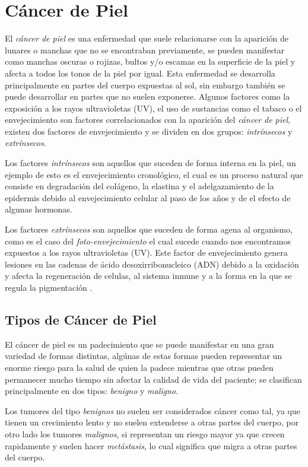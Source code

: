 \section{Cáncer de Piel}
El \emph{cáncer de piel} es una enfermedad que suele relacionarse con la aparición de lunares o manchas que no se encontraban previamente, se pueden manifestar como manchas oscuras o rojizas, bultos y/o escamas en la superficie de la piel y afecta a todos los tonos de la piel por igual. Esta enfermedad se desarrolla principalmente en partes del cuerpo expuestas al sol, sin embargo también se puede desarrollar en partes que no suelen exponerse. Algunos factores como la exposición a los rayos ultravioletas (UV), el uso de sustancias como el tabaco o el envejecimiento son factores correlacionados con la aparición del \emph{cáncer de piel}, existen dos factores de envejecimiento y se dividen en dos grupos: \emph{intrínsecos} y \emph{extrínsecos}.

Los factores \emph{intrínsecos} son aquellos que suceden de forma interna en la piel, un ejemplo de esto es el envejecimiento cronológico, el cual es un proceso natural que consiste en degradación del colágeno, la elastina y el adelgazamiento de la epidermis debido al envejecimiento celular al paso de los años y de el efecto de algunas hormonas.

Los factores \emph{extrínsecos} son aquellos que suceden de forma agena al organismo, como es el caso del \emph{foto-envejecimiento} el cual sucede cuando nos encontramos expuestos a los rayos ultravioletas (UV). Este factor de envejecimiento genera lesiones en las cadenas de ácido desoxirribonucleico (ADN) debido a la oxidación y afecta la regeneración de celulas, al sistema inmune y a la forma en la que se regula la pigmentación \citep{skin_aging}.

\subsection{Tipos de Cáncer de Piel}
El cáncer de piel es un padecimiento que se puede manifestar en una gran variedad de formas distintas, algúnas de estas formas pueden representar un enorme riesgo para la salud de quien la padece mientras que otras pueden permanecer mucho tiempo sin afectar la calidad de vida del paciente; se clasifican principalmente en dos tipos: \emph{benigno} y \emph{maligno}.

Los tumores del tipo \emph{benignos} no suelen ser considerados cáncer como tal, ya que tienen un crecimiento lento y no suelen extenderse a otras partes del cuerpo, por otro lado los tumores \emph{malignos}, si representan un riesgo mayor ya que crecen rapidamente y suelen hacer \emph{metástasis}, lo cual significa que migra a otras partes del cuerpo.

